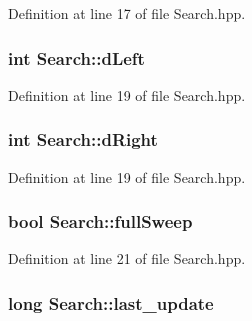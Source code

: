 Definition at line 17 of file Search.\-hpp.

\hypertarget{classSearch_aeab525e9821cdb2dc5ed996a207d9084}{
\subsubsection[{d\-Left}]{\setlength{\rightskip}{0pt plus 5cm}int Search\-::d\-Left\hspace{0.3cm}{\ttfamily [private]}}}\label{classSearch_aeab525e9821cdb2dc5ed996a207d9084}


Definition at line 19 of file Search.\-hpp.

\hypertarget{classSearch_a376def82b93387197752cc169ddf060e}{
\subsubsection[{d\-Right}]{\setlength{\rightskip}{0pt plus 5cm}int Search\-::d\-Right\hspace{0.3cm}{\ttfamily [private]}}}\label{classSearch_a376def82b93387197752cc169ddf060e}


Definition at line 19 of file Search.\-hpp.

\hypertarget{classSearch_a113ce5d7076372bbe5041749f42a7ee3}{
\subsubsection[{full\-Sweep}]{\setlength{\rightskip}{0pt plus 5cm}bool Search\-::full\-Sweep\hspace{0.3cm}{\ttfamily [private]}}}\label{classSearch_a113ce5d7076372bbe5041749f42a7ee3}


Definition at line 21 of file Search.\-hpp.

\hypertarget{classSearch_ac5a0e7842cdfec65c8af8fd2dd0d4dcc}{
\subsubsection[{last\-\_\-update}]{\setlength{\rightskip}{0pt plus 5cm}long Search\-::last\-\_\-update\hspace{0.3cm}{\ttfamily [private]}}}\label{classSearch_ac5a0e7842cdfec65c8af8fd2dd0d4dcc}


